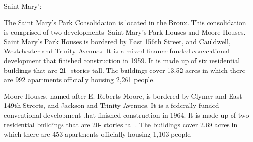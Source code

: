 Saint Mary':    \par \vspace{.7\baselineskip}  \par \vspace{.7\baselineskip}The Saint Mary's Park Consolidation is located in the Bronx. This consolidation is comprised of two developments: Saint Mary's Park Houses and Moore Houses. Saint Mary's Park Houses is bordered by East 156th Street, and Cauldwell, Westchester and Trinity Avenues. It is a mixed finance funded conventional development that finished construction in 1959. It is made up of six residential buildings that are 21- stories tall. The buildings cover 13.52 acres in which there are 992 apartments officially housing 2,261 people.\par \vspace{.7\baselineskip}Moore Houses, named after E. Roberts Moore, is bordered by Clymer and East 149th Streets, and Jackson and Trinity Avenues. It is a federally funded conventional development that finished construction in 1964. It is made up of two residential buildings that are 20- stories tall. The buildings cover 2.69 acres in which there are 453 apartments officially housing 1,103 people.